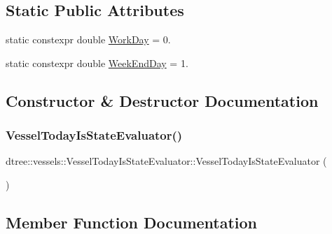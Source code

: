 \subsection*{Static Public Attributes}
\begin{DoxyCompactItemize}
\item 
static constexpr double \mbox{\hyperlink{classdtree_1_1vessels_1_1_vessel_today_is_state_evaluator_ac1c87e23226c4231957bdd4f509a4fac}{Work\+Day}} = 0.
\item 
static constexpr double \mbox{\hyperlink{classdtree_1_1vessels_1_1_vessel_today_is_state_evaluator_a4003d9e6bb39dfbeadb2d6adf866a399}{Week\+End\+Day}} = 1.
\end{DoxyCompactItemize}


\subsection{Constructor \& Destructor Documentation}
\mbox{\label{classdtree_1_1vessels_1_1_vessel_today_is_state_evaluator_a3e9950557cd0615ecbbe02411ca4d238}} 
\subsubsection{\texorpdfstring{VesselTodayIsStateEvaluator()}{VesselTodayIsStateEvaluator()}}
{\footnotesize\ttfamily dtree\+::vessels\+::\+Vessel\+Today\+Is\+State\+Evaluator\+::\+Vessel\+Today\+Is\+State\+Evaluator (\begin{DoxyParamCaption}{ }\end{DoxyParamCaption})\hspace{0.3cm}{\ttfamily [inline]}}



\subsection{Member Function Documentation}
\mbox{\label{classdtree_1_1vessels_1_1_vessel_today_is_state_evaluator_ae3eb964dad250654605cc0756adbf54f}} 
